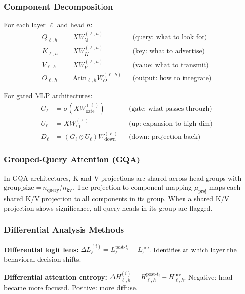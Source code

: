 \documentclass[11pt]{article}
\begin{document}
\subsubsection{Component Decomposition}

For each layer $\ell$ and head $h$:
\begin{align}
Q_{\ell,h} &= X W^{(\ell,h)}_Q & &\text{(query: what to look for)} \\
K_{\ell,h} &= X W^{(\ell,h)}_K & &\text{(key: what to advertise)} \\
V_{\ell,h} &= X W^{(\ell,h)}_V & &\text{(value: what to transmit)} \\
O_{\ell,h} &= \text{Attn}_{\ell,h} W^{(\ell,h)}_O & &\text{(output: how to integrate)}
\end{align}

For gated MLP architectures:
\begin{align}
G_\ell &= \sigma(X W^{(\ell)}_{\text{gate}}) & &\text{(gate: what passes through)} \\
U_\ell &= X W^{(\ell)}_{\text{up}} & &\text{(up: expansion to high-dim)} \\
D_\ell &= (G_\ell \odot U_\ell) W^{(\ell)}_{\text{down}} & &\text{(down: projection back)}
\end{align}

\subsubsection{Grouped-Query Attention (GQA)}

In GQA architectures, K and V projections are shared across head groups with $\text{group\_size} = n_{\text{query}} / n_{\text{kv}}$. The projection-to-component mapping $\mu_{\text{proj}}$ maps each shared K/V projection to all components in its group. When a shared K/V projection shows significance, all query heads in its group are flagged.

\subsubsection{Differential Analysis Methods}

\textbf{Differential logit lens:} $\Delta L^{(i)}_\ell = L^{\text{post-}t_i}_\ell - L^{\text{pre}}_\ell$. Identifies at which layer the behavioral decision shifts.

\textbf{Differential attention entropy:} $\Delta H^{(i)}_{\ell,h} = H^{\text{post-}t_i}_{\ell,h} - H^{\text{pre}}_{\ell,h}$. Negative: head became more focused. Positive: more diffuse.
\end{document}
